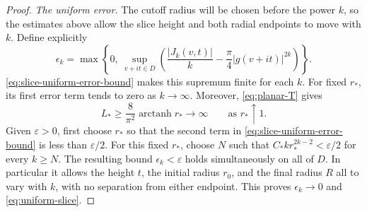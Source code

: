 \begin{proof}
\smallskip
\noindent\emph{The uniform error.} The cutoff radius will be chosen before the power $k$, so the estimates above allow the slice height and both radial endpoints to move with $k$. Define explicitly
\begin{equation}\label{eq:slice-error-sequence}
 \epsilon_k=
 \max\left\{0,\ \sup_{v+it\in D}
     \left(\frac{|J_k(v,t)|}{k}
                  -\frac{\pi}{4}|g(v+it)|^{2k}\right)\right\}.
\end{equation}
\eqref{eq:slice-uniform-error-bound} makes this supremum finite for each $k$.  For fixed $r_*$, its first error term tends to zero as $k\to\infty$.  Moreover, \eqref{eq:planar-T} gives
\[
 L_*\ge\frac{8}{\pi^2}\operatorname{arctanh}r_*
       \longrightarrow\infty
 \qquad\text{as }r_*\uparrow1.
\]
Given $\varepsilon>0$, first choose $r_*$ so that the second term in \eqref{eq:slice-uniform-error-bound} is less than $\varepsilon/2$.  For this fixed $r_*$, choose $N$ such that $C_*k r_*^{2k-2}<\varepsilon/2$ for every $k\ge N$. The resulting bound $\epsilon_k<\varepsilon$ holds simultaneously on all of $D$.  In particular it allows the height $t$, the initial radius $r_0$, and the final radius $R$ all to vary with $k$, with no separation from either endpoint.  This proves $\epsilon_k\to0$ and \eqref{eq:uniform-slice}.
\end{proof}
